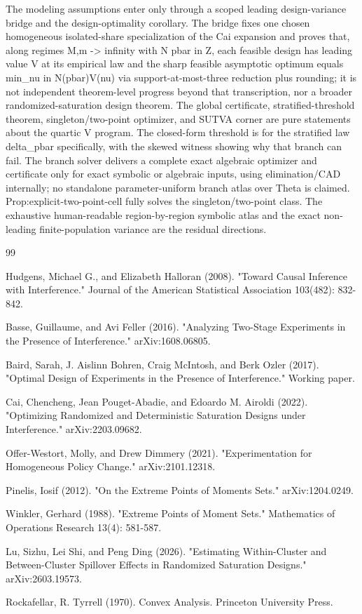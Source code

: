 \documentclass{article}
\begin{document}
The modeling assumptions enter only through a scoped leading design-variance bridge and the design-optimality corollary. The bridge fixes one chosen homogeneous isolated-share specialization of the Cai expansion and proves that, along regimes M,m -> infinity with N pbar in Z, each feasible design has leading value V at its empirical law and the sharp feasible asymptotic optimum equals min_{nu in N(pbar)}V(nu) via support-at-most-three reduction plus rounding; it is not independent theorem-level progress beyond that transcription, nor a broader randomized-saturation design theorem. The global certificate, stratified-threshold theorem, singleton/two-point optimizer, and SUTVA corner are pure statements about the quartic V program. The closed-form threshold is for the stratified law delta_pbar specifically, with the skewed witness showing why that branch can fail. The branch solver delivers a complete exact algebraic optimizer and certificate only for exact symbolic or algebraic inputs, using elimination/CAD internally; no standalone parameter-uniform branch atlas over Theta is claimed. Prop:explicit-two-point-cell fully solves the singleton/two-point class. The exhaustive human-readable region-by-region symbolic atlas and the exact non-leading finite-population variance are the residual directions.

\begin{thebibliography}{99}

   Hudgens, Michael G., and Elizabeth Halloran (2008). "Toward Causal Inference with Interference." Journal of the American Statistical Association 103(482): 832-842.

   Basse, Guillaume, and Avi Feller (2016). "Analyzing Two-Stage Experiments in the Presence of Interference." arXiv:1608.06805.

   Baird, Sarah, J. Aislinn Bohren, Craig McIntosh, and Berk Ozler (2017). "Optimal Design of Experiments in the Presence of Interference." Working paper.

   Cai, Chencheng, Jean Pouget-Abadie, and Edoardo M. Airoldi (2022). "Optimizing Randomized and Deterministic Saturation Designs under Interference." arXiv:2203.09682.

   Offer-Westort, Molly, and Drew Dimmery (2021). "Experimentation for Homogeneous Policy Change." arXiv:2101.12318.

   Pinelis, Iosif (2012). "On the Extreme Points of Moments Sets." arXiv:1204.0249.

   Winkler, Gerhard (1988). "Extreme Points of Moment Sets." Mathematics of Operations Research 13(4): 581-587.

   Lu, Sizhu, Lei Shi, and Peng Ding (2026). "Estimating Within-Cluster and Between-Cluster Spillover Effects in Randomized Saturation Designs." arXiv:2603.19573.

   Rockafellar, R. Tyrrell (1970). Convex Analysis. Princeton University Press.

\end{thebibliography}
\end{document}
